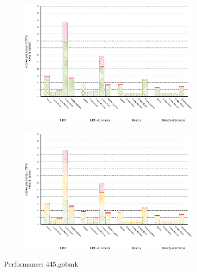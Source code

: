 \documentclass[onecolumn, openright, master, english, signatures]{dbrgrptt}
\begin{document}
\begin{figure}[!ht]
  \begin{subfigure}[b]{0.5\textwidth}%
    \includegraphics[width=\textwidth]{figs/plots/perf-misses-445-gobmk.eps}
    \label{fig:performance-445-gobmk-misses}
  \end{subfigure}%
  \begin{subfigure}[b]{0.5\textwidth}%
    \includegraphics[width=\textwidth]{figs/plots/perf-445-gobmk.eps}
    \label{fig:performance-445-gobmk-memops}
  \end{subfigure}%
  \caption{Performance: 445.gobmk}
  \label{fig:performance-445-gobmk}
\end{figure}
\end{document}
